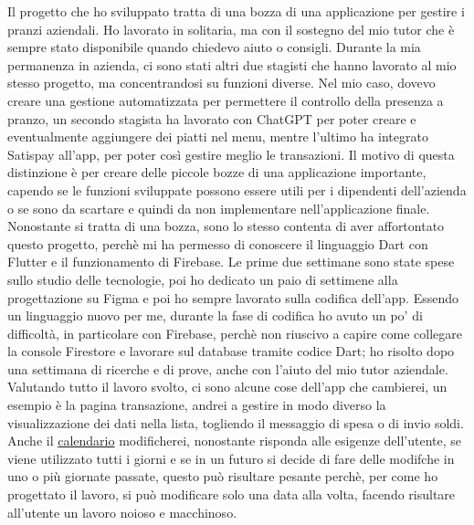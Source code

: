 Il progetto che ho sviluppato tratta di una bozza di una applicazione per gestire i pranzi aziendali.\newline
Ho lavorato in solitaria, ma con il sostegno del mio tutor che è sempre stato disponibile quando chiedevo aiuto o consigli.\newline
\newline
Durante la mia permanenza in azienda, ci sono stati altri due stagisti che hanno lavorato al mio stesso progetto, ma concentrandosi su funzioni diverse.\newline
Nel mio caso, dovevo creare una gestione automatizzata per permettere il controllo della presenza a pranzo, un secondo stagista ha lavorato con ChatGPT per poter creare e eventualmente aggiungere dei piatti nel menu, mentre l'ultimo ha integrato Satispay all'app, per poter così gestire meglio le transazioni.\newline
\newline
Il motivo di questa distinzione  è per creare delle piccole bozze di una applicazione importante, capendo se le funzioni sviluppate possono essere utili per i dipendenti dell'azienda o se sono da scartare e quindi da non implementare nell'applicazione finale.\newline
\newline
Nonostante si tratta di una bozza, sono lo stesso contenta di aver affortontato questo progetto, perchè mi ha permesso di conoscere il linguaggio Dart con Flutter e il funzionamento di Firebase.\newline
Le prime due settimane sono state spese sullo studio delle tecnologie, poi ho dedicato un paio di settimene alla progettazione su Figma e poi ho sempre lavorato sulla codifica dell'app.\newline
\newline
Essendo un linguaggio nuovo per me, durante la fase di codifica ho avuto un po' di difficoltà, in particolare con Firebase, perchè non riuscivo a capire come collegare la console Firestore e lavorare sul database tramite codice Dart; ho risolto dopo una settimana di ricerche e di prove, anche con l'aiuto del mio tutor aziendale.\newline
\newline
Valutando tutto il lavoro svolto, ci sono alcune cose dell'app che cambierei, un esempio è la pagina transazione, andrei a gestire in modo diverso la visualizzazione dei dati nella lista, togliendo il messaggio di spesa o di invio soldi.\newline
Anche il \hyperref[sec:calendario]{calendario} modificherei, nonostante risponda alle esigenze dell'utente, se viene utilizzato tutti i giorni e se in un futuro si decide di fare delle modifche in uno o più giornate passate, questo può risultare pesante perchè, per come ho progettato il lavoro, si può modificare solo una data alla volta, facendo risultare all'utente un lavoro noioso e macchinoso.\newline
